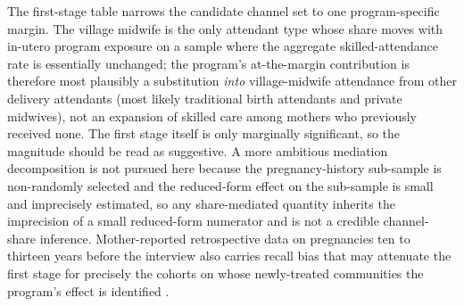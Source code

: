 The first-stage table narrows the candidate channel set to one program-specific margin. The village midwife is the only attendant type whose share moves with in-utero program exposure on a sample where the aggregate skilled-attendance rate is essentially unchanged; the program's at-the-margin contribution is therefore most plausibly a substitution \emph{into} village-midwife attendance from other delivery attendants (most likely traditional birth attendants and private midwives), not an expansion of skilled care among mothers who previously received none. The first stage itself is only marginally significant, so the magnitude should be read as suggestive. A more ambitious mediation decomposition is not pursued here because the pregnancy-history sub-sample is non-randomly selected and the reduced-form effect on the sub-sample is small and imprecisely estimated, so any share-mediated quantity inherits the imprecision of a small reduced-form numerator and is not a credible channel-share inference. Mother-reported retrospective data on pregnancies ten to thirteen years before the interview also carries recall bias that may attenuate the first stage for precisely the cohorts on whose newly-treated communities the program's effect is identified \autocite{imai2010}.
